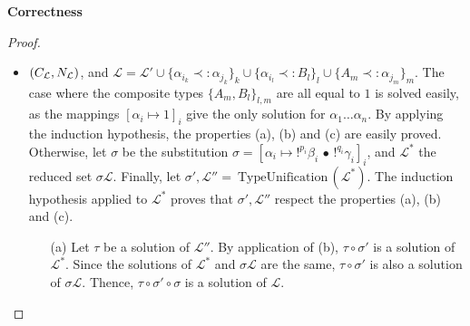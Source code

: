 \begin{thm}{\bf Correctness}
\begin{proof}
\begin{itemize}
\begin{itemize}
						\item[(b)] Let $\rho$ be a solution of $\mathcal{L}$. The property (b) applied with $\mathcal{L''}$ and $\sigma$ ensures the existence
							of $\tau$ solution of $\mathcal{L''}$ such that $\tau \circ \sigma$ is equal to $\rho$. Moreover, it follows from (c) that
							$\sigma \{ \alpha_{i_k} \prec: \alpha_{j_k} \}_k = \{\alpha_{i_k} \prec: \alpha_{j_k} \}_k$. Thus,
								$$(\tau \circ \sigma) \{\alpha_{i_k} \prec: \alpha_{j_k} \}_k = \tau \{\alpha_{i_k} \prec: \alpha_{j_k} \}_k$$
							Since $\rho = \tau \circ \sigma$ is a solution of $\{\alpha_{i_k} \prec: \alpha_{j_k} \}_k$, it follows that $\tau$ is a solution of
							$\{\alpha_{i_k} \prec: \alpha_{j_k} \}_k$, and also of $\lset'' \cup \{\alpha_{i_k} \prec: \alpha_{j_k} \}_k$. This completes
							the proof of the property (b).
					\end{itemize}
			
			\item $(C_{\mathcal{L}}, N_{\mathcal{L}})$, and $\mathcal{L} = \mathcal{L'} \cup \{ \alpha_{i_k} \prec: \alpha_{j_k} \}_k \cup
				\{ \alpha_{i_l} \prec: B_l \}_l \cup \{ A_m \prec: \alpha_{j_m} \}_m$.
				The case where the composite types $\{ A_m, B_l \}_{l, m}$ are all equal to $1$ is solved easily, as the mappings
				$[\alpha_i \mapsto 1]_i$ give the only solution for $\alpha_1 \dots \alpha_n$.
				By applying the induction hypothesis, the properties (a), (b) and (c) are easily proved. \\
				
				Otherwise, let $\sigma$ be the substitution $\sigma = [\alpha_i \mapsto !^{p_i}\beta_i \,\bullet\, !^{q_i}\gamma_i]_i$, and
				$\mathcal{L}^*$ the reduced set $\sigma \mathcal{L}$. Finally, let $\sigma', \mathcal{L''} = ~\text{TypeUnification}\,(\mathcal{L}^*)$.
				The induction hypothesis applied to $\mathcal{L}^*$ proves that $\sigma', \mathcal{L''}$ respect the properties (a), (b) and (c).
					\begin{itemize}
						\item[(a)] Let $\tau$ be a solution of $\mathcal{L''}$. By application of (b), $\tau \circ \sigma'$ is a solution of $\mathcal{L}^*$.
							Since the solutions of $\mathcal{L}^*$ and $\sigma \mathcal{L}$ are the same, $\tau \circ \sigma'$ is also a solution of
							$\sigma \mathcal{L}$. Thence, $\tau \circ \sigma' \circ \sigma$ is a solution of $\mathcal{L}$.
							

\end{itemize}
\end{itemize}
\end{proof}
\end{thm}
